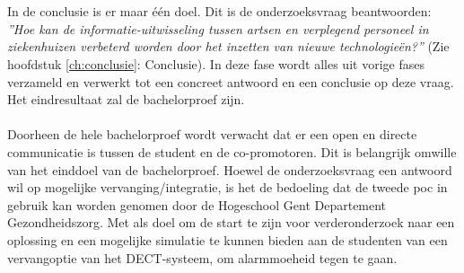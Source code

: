 \section{}
\label{sec:conclusion}
In de conclusie is er maar \'{e}\'{e}n doel. Dit is de onderzoeksvraag beantwoorden: \textit{''Hoe kan de informatie-uitwisseling tussen artsen en verplegend personeel in ziekenhuizen verbeterd worden door het inzetten van nieuwe technologieën?''} (Zie hoofdstuk \ref{ch:conclusie}: Conclusie). In deze fase wordt alles uit vorige fases verzameld en verwerkt tot een concreet antwoord en een conclusie op deze vraag. Het eindresultaat zal de bachelorproef zijn. 
\\\\
Doorheen de hele bachelorproef wordt verwacht dat er een open en directe communicatie is tussen de student en de co-promotoren. Dit is belangrijk omwille van het einddoel van de bachelorproef. Hoewel de onderzoeksvraag een antwoord wil op mogelijke vervanging/integratie, is het de bedoeling dat de tweede \gls{poc} in gebruik kan worden genomen door de Hogeschool Gent Departement Gezondheidszorg. Met als doel om de start te zijn voor verderonderzoek naar een oplossing en een mogelijke simulatie te kunnen bieden aan de studenten van een vervangoptie van het DECT-systeem, om alarmmoeheid tegen te gaan.

